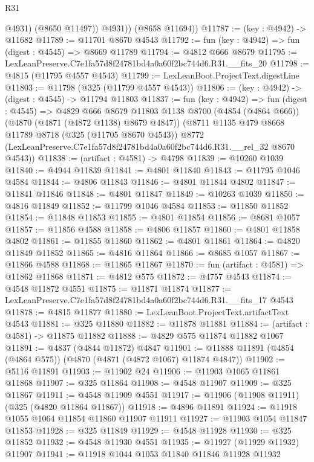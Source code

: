 \begin{lexlean}{R31}
\begin{coremodule}
              @4931)
            (@8650 @11497))
          @4931))
      (@8658 @11694))
@11787 := (key : @4942) -> @11682
@11789 := @11701 @8670 @4543
@11792 := fun (key : @4942) => fun (digest : @4545) => @8669 @11789
@11794 := @4812 @666 @8679
@11795 := LexLeanPreserve.C7e1fa57d8f24781bd4a0a60f2bc744d6.R31.__fits_20
@11798 := @4815 (@11795 @4557 @4543)
@11799 := LexLeanBoot.ProjectText.digestLine
@11803 := @11798 (@325 (@11799 @4557 @4543))
@11806 := (key : @4942) -> (digest : @4545) -> @11794 @11803
@11837 := fun (key : @4942) =>
  fun (digest : @4545) =>
  @4829
    @666
    @8679
    @11803
    @1138
    @8700
    (@4854 (@4864 @666))
    (@4870 (@4871 (@4872 @1138) @8679 @4847))
    (@8711
      @1135
      @479
      @8668
      @11789
      @8718
      (@325 (@11705 @8670 @4543))
      @8772
      (LexLeanPreserve.C7e1fa57d8f24781bd4a0a60f2bc744d6.R31.__rel_32 @8670 @4543))
@11838 := (artifact : @4581) -> @4798
@11839 := @10260 @1039
@11840 := @4944 @11839
@11841 := @4801 @11840
@11843 := @11795 @1046 @4584
@11844 := @4806 @11843
@11846 := @4801 @11844 @4802
@11847 := @11841 @11846
@11848 := @4801 @11847
@11849 := @10263 @1039
@11850 := @4816 @11849
@11852 := @11799 @1046 @4584
@11853 := @11850 @11852
@11854 := @11848 @11853
@11855 := @4801 @11854
@11856 := @8681 @1057
@11857 := @11856 @4588
@11858 := @4806 @11857
@11860 := @4801 @11858 @4802
@11861 := @11855 @11860
@11862 := @4801 @11861
@11864 := @4820 @11849 @11852
@11865 := @4816 @11864
@11866 := @8685 @1057
@11867 := @11866 @4588
@11868 := @11865 @11867
@11870 := fun (artifact : @4581) => @11862 @11868
@11871 := @4812 @575
@11872 := @4757 @4543
@11874 := @4548 @11872 @4551
@11875 := @11871 @11874
@11877 := LexLeanPreserve.C7e1fa57d8f24781bd4a0a60f2bc744d6.R31.__fits_17 @4543
@11878 := @4815 @11877
@11880 := LexLeanBoot.ProjectText.artifactText @4543
@11881 := @325 @11880
@11882 := @11878 @11881
@11884 := (artifact : @4581) -> @11875 @11882
@11888 := @4829 @575 @11874 @11882 @1067
@11891 := @4837 (@4844 @11872) @4847
@11901 := @11888 @11891 (@4854 (@4864 @575)) (@4870 (@4871 (@4872 @1067) @11874 @4847))
@11902 := @5116 @11891
@11903 := @11902 @24
@11906 := @11903 @1065 @11861 @11868
@11907 := @325 @11864
@11908 := @4548 @11907
@11909 := @325 @11867
@11911 := @4548 @11909 @4551
@11917 := @11906 (@11908 @11911) (@325 (@4820 @11864 @11867))
@11918 := @4896 @11891
@11924 := @11918 @1055 @1064 @11854 @11860 @11907 @11911
@11927 := @11903 @1054 @11847 @11853
@11928 := @325 @11849
@11929 := @4548 @11928
@11930 := @325 @11852
@11932 := @4548 @11930 @4551
@11935 := @11927 (@11929 @11932) @11907
@11941 := @11918 @1044 @1053 @11840 @11846 @11928 @11932

\end{coremodule}
\end{lexlean}
